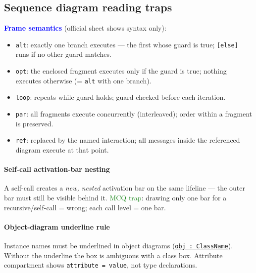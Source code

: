 \subsection{Sequence diagram reading traps}
\textcolor{Blue}{\textbf{Frame semantics}} (official sheet shows syntax only):
\begin{itemize}
  \item \textcolor{Bittersweet}{\texttt{alt}}: exactly one branch executes — the first whose guard is true; \texttt{[else]} runs if no other guard matches.
  \item \textcolor{Bittersweet}{\texttt{opt}}: the enclosed fragment executes only if the guard is true; nothing executes otherwise (= \texttt{alt} with one branch).
  \item \textcolor{Bittersweet}{\texttt{loop}}: repeats while guard holds; guard checked before each iteration.
  \item \textcolor{Bittersweet}{\texttt{par}}: all fragments execute concurrently (interleaved); order within a fragment is preserved.
  \item \textcolor{Bittersweet}{\texttt{ref}}: replaced by the named interaction; all messages inside the referenced diagram execute at that point.
\end{itemize}

\paragraph{Self-call activation-bar nesting}
A self-call creates a \emph{new, nested} activation bar on the same lifeline — the outer bar must still be visible behind it. \textcolor{ForestGreen}{MCQ trap}: drawing only one bar for a recursive/self-call = wrong; each call level = one bar.

\paragraph{Object-diagram underline rule}
Instance names must be underlined in object diagrams (\texttt{\underline{obj : ClassName}}). Without the underline the box is ambiguous with a class box. Attribute compartment shows \texttt{attribute = value}, not type declarations.
